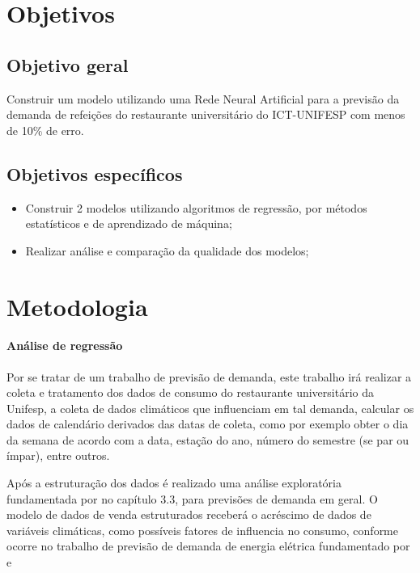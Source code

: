 \documentclass[	12pt, Times, openright, twoside, a4paper, english, brazil]{abntex2}
\begin{document}
      \section{Objetivos}
        \subsection{Objetivo geral}
          Construir um modelo utilizando uma Rede Neural Artificial para a previsão da demanda de
          refeições do restaurante universitário do ICT-UNIFESP com menos de 10\% de erro.
        
        \subsection{Objetivos específicos}
          \begin{itemize}
          \item Construir 2 modelos utilizando algoritmos de regressão, por métodos estatísticos e de aprendizado de máquina; 
          \item Realizar análise e comparação da qualidade dos modelos;
          \end{itemize}

      \section{Metodologia}
        \paragraph*{Análise de regressão}

          Por se tratar de um trabalho de previsão de demanda,  este trabalho irá realizar a coleta e tratamento dos dados de consumo do restaurante universitário da Unifesp, a coleta de dados climáticos que influenciam em tal demanda, calcular os dados de calendário derivados das datas de coleta, como por exemplo obter o dia da semana de acordo com a data, estação do ano, número do semestre (se par ou ímpar), entre outros.

          Após a estruturação dos dados é realizado uma análise exploratória fundamentada por \cite{Junior2007} no capítulo 3.3, para previsões de demanda em geral.
          O modelo de dados de venda estruturados receberá o acréscimo de dados de variáveis climáticas, como possíveis fatores de influencia no consumo, conforme ocorre no trabalho de previsão de demanda de energia elétrica fundamentado por \cite{Almeida2013} \cite{RUAS2012} e \cite{Silva2010}
\end{document}
